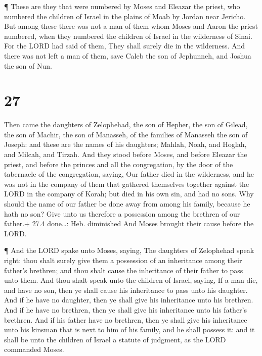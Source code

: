  ¶ These are they that were numbered by Moses and Eleazar
the priest, who numbered the children of Israel in the plains of Moab by
Jordan near Jericho.  But among these there was not a man
of them whom Moses and Aaron the priest numbered, when they numbered the
children of Israel in the wilderness of Sinai.  For the
LORD had said of them, They shall surely die in the wilderness. And
there was not left a man of them, save Caleb the son of Jephunneh, and
Joshua the son of Nun.

\hypertarget{section-26}{%
\section{27}\label{section-26}}

 Then came the daughters of Zelophehad, the son of Hepher,
the son of Gilead, the son of Machir, the son of Manasseh, of the
families of Manasseh the son of Joseph: and these are the names of his
daughters; Mahlah, Noah, and Hoglah, and Milcah, and Tirzah.
 And they stood before Moses, and before Eleazar the priest,
and before the princes and all the congregation, by the door of the
tabernacle of the congregation, saying,  Our father died in
the wilderness, and he was not in the company of them that gathered
themselves together against the LORD in the company of Korah; but died
in his own sin, and had no sons.  Why should the name of our
father be done away from among his family, because he hath no son? Give
unto us therefore a possession among the brethren of our father.+ 27.4
done\ldots: Heb. diminished  And Moses brought their cause
before the LORD.

 ¶ And the LORD spake unto Moses, saying,  The
daughters of Zelophehad speak right: thou shalt surely give them a
possession of an inheritance among their father's brethren; and thou
shalt cause the inheritance of their father to pass unto them.
 And thou shalt speak unto the children of Israel, saying,
If a man die, and have no son, then ye shall cause his inheritance to
pass unto his daughter.  And if he have no daughter, then ye
shall give his inheritance unto his brethren.  And if he
have no brethren, then ye shall give his inheritance unto his father's
brethren.  And if his father have no brethren, then ye
shall give his inheritance unto his kinsman that is next to him of his
family, and he shall possess it: and it shall be unto the children of
Israel a statute of judgment, as the LORD commanded Moses.

